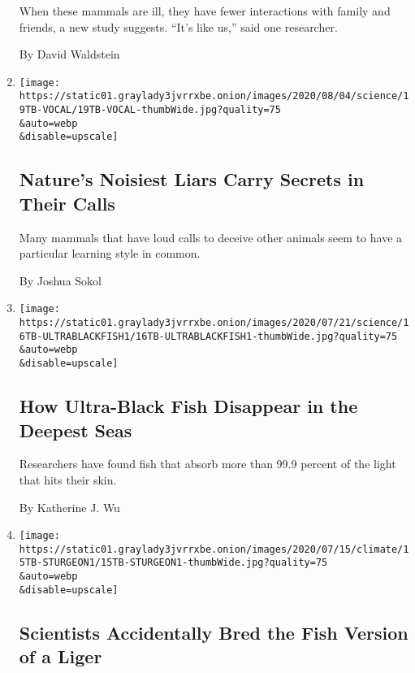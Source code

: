 \begin{enumerate}
  When these mammals are ill, they have fewer interactions with family
  and friends, a new study suggests. ``It's like us,'' said one
  researcher.

  By David Waldstein
\item
  \href{/2020/07/21/science/mammals-vocal-learning.html}{}

  \texttt{[image: https://static01.graylady3jvrrxbe.onion/images/2020/08/04/science/19TB-VOCAL/19TB-VOCAL-thumbWide.jpg?quality=75\\\&auto=webp\\\&disable=upscale]}

  \hypertarget{natures-noisiest-liars-carry-secrets-in-their-calls}{%
  \subsection{Nature's Noisiest Liars Carry Secrets in Their
  Calls}\label{natures-noisiest-liars-carry-secrets-in-their-calls}}

  Many mammals that have loud calls to deceive other animals seem to
  have a particular learning style in common.

  By Joshua Sokol
\item
  \href{/2020/07/16/science/ultra-black-fish.html}{}

  \texttt{[image: https://static01.graylady3jvrrxbe.onion/images/2020/07/21/science/16TB-ULTRABLACKFISH1/16TB-ULTRABLACKFISH1-thumbWide.jpg?quality=75\\\&auto=webp\\\&disable=upscale]}

  \hypertarget{how-ultra-black-fish-disappear-in-the-deepest-seas}{%
  \subsection{How Ultra-Black Fish Disappear in the Deepest
  Seas}\label{how-ultra-black-fish-disappear-in-the-deepest-seas}}

  Researchers have found fish that absorb more than 99.9 percent of the
  light that hits their skin.

  By Katherine J. Wu
\item
  \href{/2020/07/15/science/hybrid-sturgeon-paddlefish.html}{}

  \texttt{[image: https://static01.graylady3jvrrxbe.onion/images/2020/07/15/climate/15TB-STURGEON1/15TB-STURGEON1-thumbWide.jpg?quality=75\\\&auto=webp\\\&disable=upscale]}

  \hypertarget{scientists-accidentally-bred-the-fish-version-of-a-liger}{%
  \subsection{Scientists Accidentally Bred the Fish Version of a
  Liger}\label{scientists-accidentally-bred-the-fish-version-of-a-liger}}


\end{enumerate}
